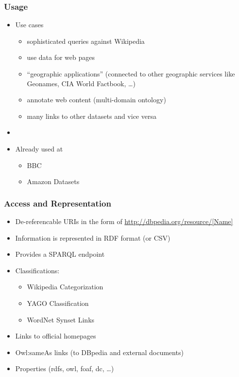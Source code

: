 \begin{frame}
\frametitle{Usage}
\begin{itemize}
  \item Use cases

	\begin{itemize}
	  \item sophisticated queries against Wikipedia
	  \item use data for web pages
	  \item ``geographic applications'' (connected to other geographic services
	  like Geonames, CIA World Factbook, \ldots)
	  \item annotate web content (multi-domain ontology)
	  \item many links to other datasets and vice versa
	\end{itemize}
	\item[]
	\item Already used at
	\begin{itemize}
	  \item BBC
	  \item Amazon Datasets
	 \end{itemize}
\end{itemize}
\end{frame}


\begin{frame}
\frametitle{Access and Representation}
\begin{itemize}
  \item De-referencable URIs in the form of
  \url{http://dbpedia.org/resource/[Name]}
  \item Information is represented in RDF format (or CSV)
  \item Provides a SPARQL endpoint
  \item Classifications:
  \begin{itemize}
    \item Wikipedia Categorization
    \item YAGO Classification
    \item WordNet Synset Links
  \end{itemize}
  \item Links to official homepages
  \item Owl:sameAs links (to DBpedia and external documents)
  \item Properties (rdfs, owl, foaf, dc, \ldots)
  
\end{itemize}
\end{frame}

